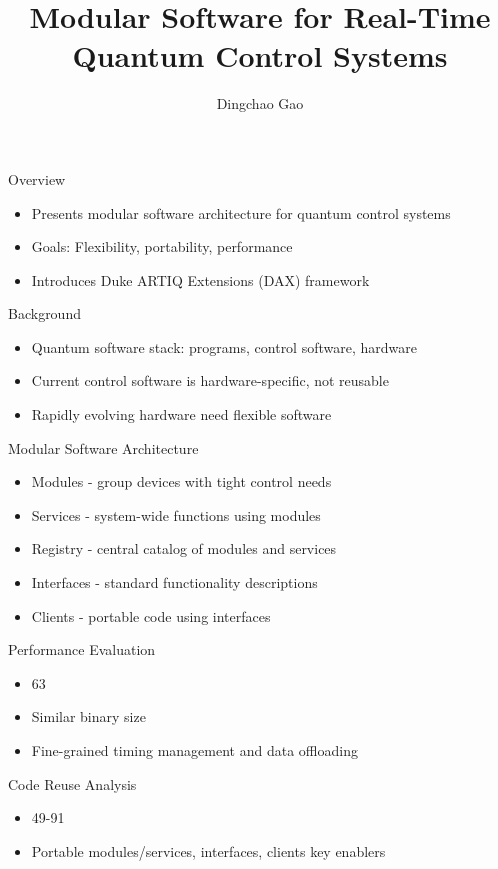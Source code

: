 \documentclass[18 pt]{beamer}
\title{Modular Software for Real-Time Quantum Control Systems}
\author[Gcc]{Dingchao Gao}
\institute[ISCAS]{Institute of Software Chinese Academy of Sciences}
\begin{document}
\frame{\titlepage}

\begin{frame}{Overview}
\begin{itemize}
\item Presents modular software architecture for quantum control systems
\item Goals: Flexibility, portability, performance
\item Introduces Duke ARTIQ Extensions (DAX) framework

\end{itemize}
\end{frame}

\begin{frame}{Background}
\begin{itemize}
\item Quantum software stack: programs, control software, hardware
\item Current control software is hardware-specific, not reusable
\item Rapidly evolving hardware \rightarrow need flexible software
\end{itemize}
\end{frame}

\begin{frame}{Modular Software Architecture}
\begin{itemize}
\item Modules - group devices with tight control needs
\item Services - system-wide functions using modules
\item Registry - central catalog of modules and services
\item Interfaces - standard functionality descriptions

\item Clients - portable code using interfaces
\end{itemize}
\end{frame}

\begin{frame}{Performance Evaluation}
\begin{itemize}
\item 63%
\item Similar binary size
\item Fine-grained timing management and data offloading
\end{itemize}
\end{frame}

\begin{frame}{Code Reuse Analysis}
\begin{itemize}
\item 49-91%
\item Portable modules/services, interfaces, clients key enablers
\end{itemize}
\end{frame}
\end{document}
